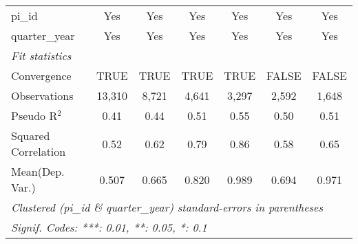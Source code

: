 \begin{tabular}{lcccccc}
   pi\_id                                                     & Yes           & Yes           & Yes           & Yes           & Yes           & Yes\\  
   quarter\_year                                              & Yes           & Yes           & Yes           & Yes           & Yes           & Yes\\  
   \midrule
   \emph{Fit statistics}\\
   Convergence                                                &TRUE           & TRUE          & TRUE          & TRUE          & FALSE         & FALSE\\  
   Observations                                               & 13,310        & 8,721         & 4,641         & 3,297         & 2,592         & 1,648\\  
   Pseudo R$^2$                                               & 0.41          & 0.44          & 0.51          & 0.55          & 0.50          & 0.51\\  
   Squared Correlation                                        & 0.52          & 0.62          & 0.79          & 0.86          & 0.58          & 0.65\\  
Mean(Dep. Var.) & 0.507 & 0.665 & 0.820 & 0.989 & 0.694 & 0.971 \\
   \midrule \midrule
   \multicolumn{7}{l}{\emph{Clustered (pi\_id \& quarter\_year) standard-errors in parentheses}}\\
   \multicolumn{7}{l}{\emph{Signif. Codes: ***: 0.01, **: 0.05, *: 0.1}}\\
\end{tabular}
\par\endgroup
